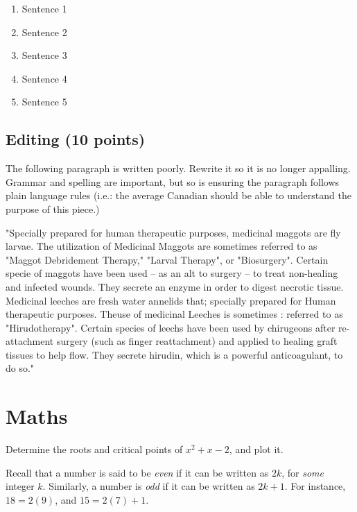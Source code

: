 \documentclass[11pt]{exam}
\begin{document}
\begin{questions}
\begin{enumerate}
\begin{enumerate}
\item Sentence 1
\item Sentence 2
\item Sentence 3
\item Sentence 4
\item Sentence 5
\end{enumerate}

\end{enumerate}

\newpage
\subsection{Editing (10 points)}
\setcounter{question}{0}
\question The following paragraph is written poorly. Rewrite it so it is no longer appalling. Grammar and spelling are important, but so is ensuring the paragraph follows plain language rules (i.e.: the average Canadian should be able to understand the purpose of this piece.)

\vspace{1cm}

"Specially prepared for human therapeutic purposes, medicinal maggots are fly larvae. The utilization of Medicinal Maggots are sometimes referred to as "Maggot Debridement Therapy," "Larval Therapy", or "Biosurgery". Certain specie of maggots have been used -- as an alt to surgery -- to treat non-healing and infected wounds. They secrete an enzyme in order to digest necrotic tissue. Medicinal leeches are fresh water annelids that; specially prepared for Human therapeutic purposes. Theuse of medicinal Leeches is sometimes : referred to as "Hirudotherapy".  Certain species of leechs have been used by chirugeons after re-attachment surgery (such as finger reattachment) and applied to healing graft tissues to help flow. They secrete hirudin, which is a powerful anticoagulant, to do so."

\vfill

\newpage
\section{Maths}
\setcounter{question}{0}

\question[8] Determine the roots and critical points of $x^2 + x - 2$, and plot
it.
\vfill




\newpage
\question Recall that a number is said to be \emph{even} if it can be written
as $2k$, for \emph{some} integer $k$. Similarly, a number is \emph{odd} if it
can be written as $2k + 1$. For instance, $18 = 2(9)$, and $15 = 2(7) + 1$.


\end{questions}
\end{document}
